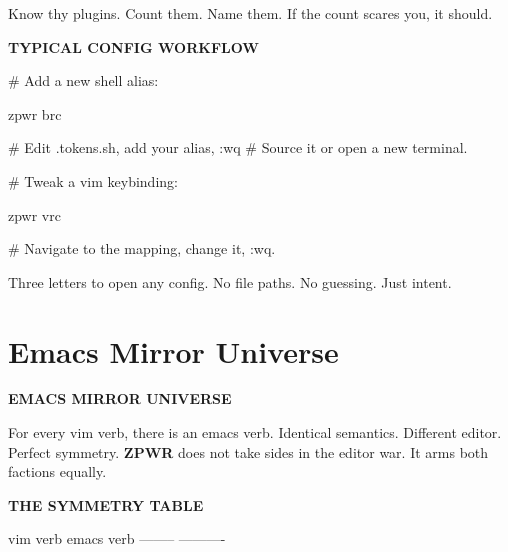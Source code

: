 \documentclass[11pt,a4paper,twoside]{book}
\begin{document}
Know thy plugins. Count them. Name them. If the count scares you, it should.


\vspace{12pt}
{\bfseries\color{neonyellow} TYPICAL CONFIG WORKFLOW}\vspace{4pt}

\# Add a new shell alias:

\begin{codebox}
\color{neongreen}zpwr brc\\
\end{codebox}

\# Edit .tokens.sh, add your alias, :wq \# Source it or open a new terminal.

\# Tweak a vim keybinding:

\begin{codebox}
\color{neongreen}zpwr vrc\\
\end{codebox}

\# Navigate to the mapping, change it, :wq.

Three letters to open any config. No file paths. No guessing. Just intent.


\vspace{16pt}

\section{Emacs Mirror Universe}


\vspace{10pt}
{\large\bfseries\color{neoncyan} EMACS MIRROR UNIVERSE}\vspace{6pt}

For every vim verb, there is an emacs verb. Identical semantics. Different editor. Perfect symmetry. \textbf{ZPWR} does not take sides in the editor war. It arms both factions equally.


\vspace{12pt}
{\bfseries\color{neonyellow} THE SYMMETRY TABLE}\vspace{4pt}

vim verb              emacs verb --------              ----------
\end{document}
